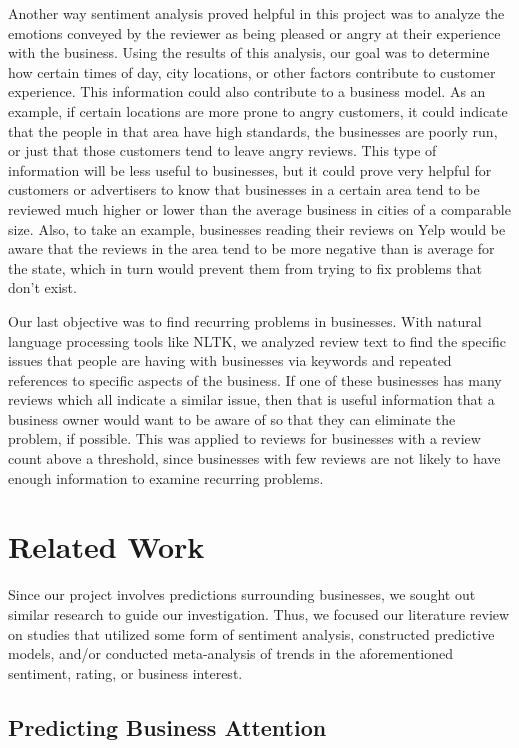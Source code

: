 \quad Another way sentiment analysis proved helpful in this project was to analyze the emotions conveyed by the reviewer as being pleased or angry at their experience with the business. Using the results of this analysis, our goal was to determine how certain times of day, city locations, or other factors contribute to customer experience. This information could also contribute to a business model. As an example, if certain locations are more prone to angry customers, it could indicate that the people in that area have high standards, the businesses are poorly run, or just that those customers tend to leave angry reviews. This type of information will be less useful to businesses, but it could prove very helpful for customers or advertisers to know that businesses in a certain area tend to be reviewed much higher or lower than the average business in cities of a comparable size. Also, to take an example, businesses reading their reviews on Yelp would be aware that the reviews in the area tend to be more negative than is average for the state, which in turn would prevent them from trying to fix problems that don’t exist.

\quad Our last objective was to find recurring problems in businesses. With natural language processing tools like NLTK, we analyzed review text to find the specific issues that people are having with businesses via keywords and repeated references to specific aspects of the business. If one of these businesses has many reviews which all indicate a similar issue, then that is useful information that a business owner would want to be aware of so that they can eliminate the problem, if possible. This was applied to reviews for businesses with a review count above a threshold, since businesses with few reviews are not likely to have enough information to examine recurring problems.

\section{Related Work}

\quad Since our project involves predictions surrounding businesses, we sought out similar research to guide our investigation. Thus, we focused our literature review on studies that utilized some form of sentiment analysis, constructed predictive models, and/or conducted meta-analysis of trends in the aforementioned sentiment, rating, or business interest.

\subsection{Predicting Business Attention}

